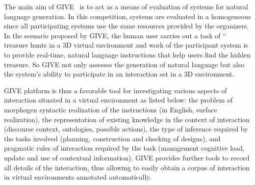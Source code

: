 The main aim of GIVE~\cite{byron09}  is to act as a means of evaluation of
systems for natural language generation. In this competition, systems are
evaluated in a homogeneous since all participating systems use the same
resources provided by the organizers. In the scenario proposed by GIVE, the
human user carries out a task of `` treasure hunts in a 3D virtual environment
and work of the participant system is to provide real-time, natural language
instructions that help users find the hidden treasure. So GIVE not only assesses
the generation of natural language but also the system's ability to participate
in an interaction set in a 3D environment.
% 

GIVE platform is thus a favorable tool for investigating various aspects of
interaction situated in a virtual environment as listed below: the problem of
morphogen syntactic realization of the instructions (in English, surface
realization), the representation of existing knowledge in the context of
interaction (discourse context, ontologies, possible actions), the type of
inference required by the tasks involved (planning, construction and checking of
designs), and pragmatic rules of interaction required by the task (management
cognitive load, update and use of contextual information). GIVE provides further
tools to record all details of the interaction, thus allowing to easily obtain a
corpus of interaction in virtual environments annotated automatically.



